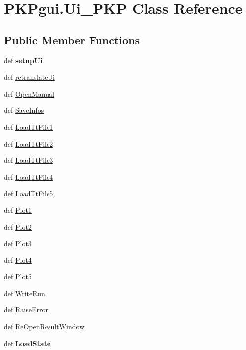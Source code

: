 \hypertarget{classPKPgui_1_1Ui__PKP}{\section{\-P\-K\-Pgui.\-Ui\-\_\-\-P\-K\-P \-Class \-Reference}
\label{classPKPgui_1_1Ui__PKP}
}
\subsection*{\-Public \-Member \-Functions}
\begin{DoxyCompactItemize}
\item 
\hypertarget{classPKPgui_1_1Ui__PKP_ae3e8bb330f8e3cb769a43b7248c9c210}{def {\bfseries setup\-Ui}}\label{classPKPgui_1_1Ui__PKP_ae3e8bb330f8e3cb769a43b7248c9c210}

\item 
def \hyperlink{classPKPgui_1_1Ui__PKP_a056261bf7b25d4ddbd57f34bae889c6b}{retranslate\-Ui}
\item 
def \hyperlink{classPKPgui_1_1Ui__PKP_a6ead41b34971c8aabce87fc75ff2a554}{\-Open\-Manual}
\item 
def \hyperlink{classPKPgui_1_1Ui__PKP_a27cc7ee90ecf2e67c8e4a2e68057be45}{\-Save\-Infos}
\item 
def \hyperlink{classPKPgui_1_1Ui__PKP_aea10bee40a0beade8419e79ddfa38b99}{\-Load\-Tt\-File1}
\item 
def \hyperlink{classPKPgui_1_1Ui__PKP_a1c3cc63f7da627d4cc8b5fc6a4d399aa}{\-Load\-Tt\-File2}
\item 
def \hyperlink{classPKPgui_1_1Ui__PKP_a6d84c002092b3c2a70985c37833757d2}{\-Load\-Tt\-File3}
\item 
def \hyperlink{classPKPgui_1_1Ui__PKP_a683a0a30a2c5c0675e04464b6475c4ad}{\-Load\-Tt\-File4}
\item 
def \hyperlink{classPKPgui_1_1Ui__PKP_a011acfe22957aab6d4381a5a2df1c16e}{\-Load\-Tt\-File5}
\item 
def \hyperlink{classPKPgui_1_1Ui__PKP_a1de23c077aacfb2e13cbc4fdc5be281f}{\-Plot1}
\item 
def \hyperlink{classPKPgui_1_1Ui__PKP_a7170dffb6875fb7d709ee7480b640885}{\-Plot2}
\item 
def \hyperlink{classPKPgui_1_1Ui__PKP_a01ec760c10b10938b73aa65267e86e1f}{\-Plot3}
\item 
def \hyperlink{classPKPgui_1_1Ui__PKP_aaf2cf4f8e6f8a0770e256a5810a6e132}{\-Plot4}
\item 
def \hyperlink{classPKPgui_1_1Ui__PKP_a158748bc711bd7c7182b4c482b1640e7}{\-Plot5}
\item 
def \hyperlink{classPKPgui_1_1Ui__PKP_a1678a6d812b5133f2a76f94203f90ef5}{\-Write\-Run}
\item 
def \hyperlink{classPKPgui_1_1Ui__PKP_a723ef4112a036ee96ad0fdcf35f3ee80}{\-Raise\-Error}
\item 
def \hyperlink{classPKPgui_1_1Ui__PKP_a9a4f443536282e39133ca3272ecce9d4}{\-Re\-Open\-Result\-Window}
\item 
\hypertarget{classPKPgui_1_1Ui__PKP_a56a74a85a72f50e6ea847313980da477}{def {\bfseries \-Load\-State}}\label{classPKPgui_1_1Ui__PKP_a56a74a85a72f50e6ea847313980da477}

\end{DoxyCompactItemize}
